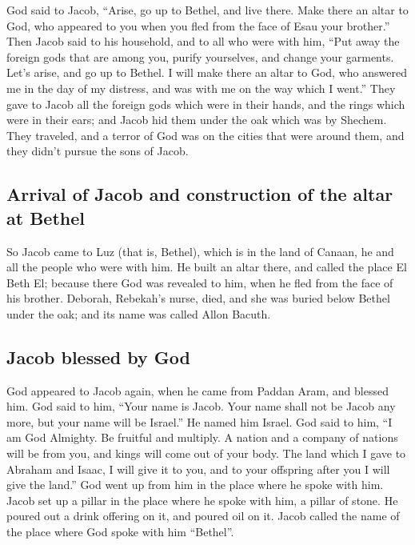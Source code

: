  God said to Jacob, ``Arise, go up to Bethel, and live
there. Make there an altar to God, who appeared to you when you fled
from the face of Esau your brother.''  Then Jacob said to
his household, and to all who were with him, ``Put away the foreign gods
that are among you, purify yourselves, and change your garments.
 Let's arise, and go up to Bethel. I will make there an
altar to God, who answered me in the day of my distress, and was with me
on the way which I went.''  They gave to Jacob all the
foreign gods which were in their hands, and the rings which were in
their ears; and Jacob hid them under the oak which was by Shechem.
 They traveled, and a terror of God was on the cities that
were around them, and they didn't pursue the sons of Jacob.

\hypertarget{arrival-of-jacob-and-construction-of-the-altar-at-bethel}{%
\subsection{Arrival of Jacob and construction of the altar at
Bethel}\label{arrival-of-jacob-and-construction-of-the-altar-at-bethel}}

 So Jacob came to Luz (that is, Bethel), which is in the
land of Canaan, he and all the people who were with him. 
He built an altar there, and called the place El Beth El; because there
God was revealed to him, when he fled from the face of his brother.
 Deborah, Rebekah's nurse, died, and she was buried below
Bethel under the oak; and its name was called Allon Bacuth.

\hypertarget{jacob-blessed-by-god}{%
\subsection{Jacob blessed by God}\label{jacob-blessed-by-god}}

 God appeared to Jacob again, when he came from Paddan
Aram, and blessed him.  God said to him, ``Your name is
Jacob. Your name shall not be Jacob any more, but your name will be
Israel.'' He named him Israel.  God said to him, ``I am
God Almighty. Be fruitful and multiply. A nation and a company of
nations will be from you, and kings will come out of your body.
 The land which I gave to Abraham and Isaac, I will give
it to you, and to your offspring after you I will give the land.''
 God went up from him in the place where he spoke with
him.  Jacob set up a pillar in the place where he spoke
with him, a pillar of stone. He poured out a drink offering on it, and
poured oil on it.  Jacob called the name of the place
where God spoke with him ``Bethel''.

